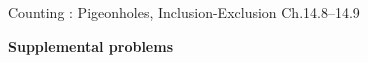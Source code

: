 \documentclass[handout]{mcs}
\begin{document}
\begin{staffnotes}
Counting : Pigeonholes, Inclusion-Exclusion Ch.14.8--14.9
\end{staffnotes}



\newpage

\begin{center}
\textbf{\large Supplemental problems}
\end{center}


\end{document}
